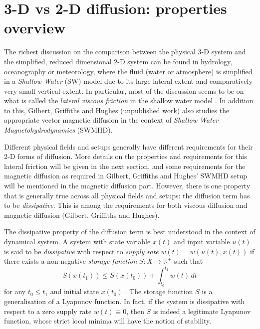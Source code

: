 \section{3-D vs 2-D diffusion: properties overview}

The richest discussion on the comparison between the physical 3-D system and the simplified, reduced dimensional 2-D system can be found in hydrology, oceanography or meteorology, where the fluid (water or atmosphere) is simplified in a \textit{Shallow Water} (SW) model due to its large lateral extent and comparatively very small vertical extent.
In particular, most of the discussion seems to be on what is called the \textit{lateral viscous friction} in the shallow water model \parencite{shchepetkin_physically_1996,gerbeau_derivation_2001,gilbert_form_2014}. In addition to this, Gilbert, Griffiths and Hughes (unpublished work) also studies the appropriate vector magnetic diffusion in the context of \textit{Shallow Water Magnetohydrodynamics} (SWMHD). 

Different physical fields and setups generally have different requirements for their 2-D forms of diffusion. More details on the properties and requirements for this lateral friction will be given in the next section, and some requirements for the magnetic diffusion as required in Gilbert, Griffiths and Hughes' SWMHD setup will be mentioned in the magnetic diffusion part. However, there is one property that is generally true across all physical fields and setups: the diffusion term has to be \textit{dissipative}. This is among the requirements for both viscous diffusion \parencite{shchepetkin_physically_1996} and magnetic diffusion (Gilbert, Griffiths and Hughes).

The dissipative property of the diffusion term is best understood in the context of dynamical system. A system with state variable $x(t)$ and input variable $u(t)$ is said to be \textit{dissipative} with respect to \textit{supply rate} $w(t) = w(u(t), x(t))$ if there exists a non-negative \textit{storage function} $S: X \mapsto \mathbb{R}^+$ such that 
\begin{equation}\label{eqn:dissipation-def}
    S(x(t_1)) \leq S(x(t_0)) + \int_{t_0}^{t_1} w(t) \, dt
\end{equation}
for any $t_0\leq t_1$ and initial state $x(t_0)$ \parencite{willems_dissipative_1972}. The storage function $S$ is a generalisation of a Lyapunov function. In fact, if the system is dissipative with respect to a zero supply rate $w(t) \equiv 0$, then $S$ is indeed a legitimate Lyapunov function, whose strict local minima will have the notion of stability.

